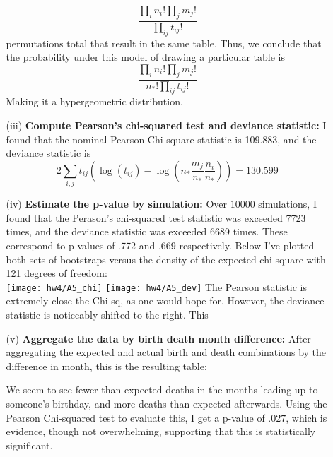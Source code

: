 \documentclass[11pt]{article}
\theoremstyle{definition}
\begin{document}
\begin{itemize}
\begin{itemize}
                \[ \frac{\prod_i n_i! \prod_j m_j!}{\prod_{ij} t_{ij}!} \]
                permutations total that result in the same table. Thus, we conclude that the probability under this model of drawing a particular table is
                \[\frac{\prod_i n_i! \prod_j m_j!}{n_*! \prod_{ij} t_{ij}!}\]
                Making it a hypergeometric distribution.
            \item[(iii)] {\bf Compute Pearson's chi-squared test and deviance statistic:} 
                I found that the nominal Pearson Chi-square statistic is 109.883, and the deviance statistic is
                \[ 2\sum_{i,j}t_{ij}\left(\log(t_{ij})-\log\left(n_*\frac{m_j}{n_*}\frac{n_i}{n_*}\right)\right) = 130.599 \]
            \item[(iv)] {\bf Estimate the p-value by simulation:} 
                Over $10000$ simulations, I found that the Perason's chi-squared test statistic was exceeded 7723 times, and the deviance statistic was exceeded 6689 times. These correspond to p-values of .772 and .669 respectively. Below I've plotted both sets of bootstraps versus the density of the expected chi-square with 121 degrees of freedom: \\
                \texttt{[image: hw4/A5\_chi]} 
                \texttt{[image: hw4/A5\_dev]} 
                The Pearson statistic is extremely close the Chi-sq, as one would hope for. However, the deviance statistic is noticeably shifted to the right. This 
            \item[(v)] {\bf Aggregate the data by birth death month difference:} 
                After aggregating the expected and actual birth and death combinations by the difference in month, this is the resulting table:
                \FloatBarrier
                
                \FloatBarrier
                We seem to see fewer than expected deaths in the months leading up to someone's birthday, and more deaths than expected afterwards. Using the Pearson Chi-squared test to evaluate this, I get a p-value of $.027$, which is evidence, though not overwhelming, supporting that this is statistically significant.


\end{itemize}
\end{itemize}
\end{document}
